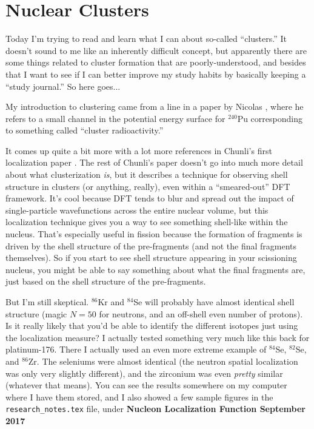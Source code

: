 \chapter{Nuclear Clusters}

Today I'm trying to read and learn what I can about so-called ``clusters.'' It doesn't sound to me like an inherently difficult concept, but apparently there are some things related to cluster formation that are poorly-understood, and besides that I want to see if I can better improve my study habits by basically keeping a ``study journal.'' So here goes...

My introduction to clustering came from a line in a paper by Nicolas \cite{Schunck2014PES}, where he refers to a small channel in the potential energy surface for $^{240}$Pu corresponding to something called ``cluster radioactivity.''

It comes up quite a bit more with a lot more references in Chunli's first localization paper \cite{Zhang2016localization}. The rest of Chunli's paper doesn't go into much more detail about what clusterization \textit{is}, but it describes a technique for observing shell structure in clusters (or anything, really), even within a ``smeared-out'' DFT framework. It's cool because DFT tends to blur and spread out the impact of single-particle wavefunctions across the entire nuclear volume, but this localization technique gives you a way to see something shell-like within the nucleus. That's especially useful in fission because the formation of fragments is driven by the shell structure of the pre-fragments (and not the final fragments themselves). So if you start to see shell structure appearing in your scissioning nucleus, you might be able to say something about what the final fragments are, just based on the shell structure of the pre-fragments.

But I'm still skeptical. $^{86}$Kr and $^{84}$Se will probably have almost identical shell structure (magic $N=50$ for neutrons, and an off-shell even number of protons). Is it really likely that you'd be able to identify the different isotopes just using the localization measure? I actually tested something very much like this back for platinum-176. There I actually used an even more extreme example of $^{84}$Se, $^{82}$Se, and $^{86}$Zr. The seleniums were almost identical (the neutron spatial localization was only very slightly different), and the zirconium was even \textit{pretty} similar (whatever that means). You can see the results somewhere on my computer where I have them stored, and I also showed a few sample figures in the \texttt{research\_notes.tex} file, under \textbf{Nucleon Localization Function  September 2017}

